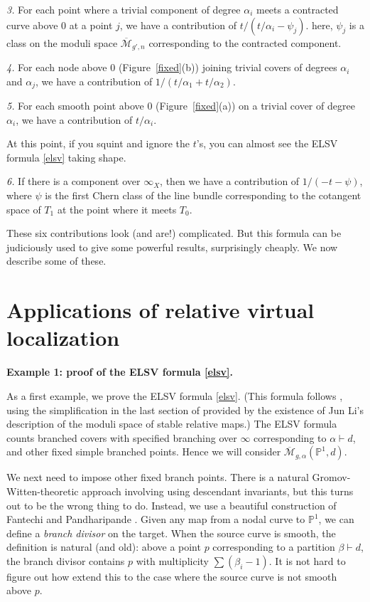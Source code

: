 \documentclass[12pt,letterpaper]{amsart}
\newcommand{\bpoint}[1]{\vspace{3mm}\par \noindent \refstepcounter{subsection}{\bf \thesubsection.} 
  {\bf #1.} }
\newcommand{\proj}{\mathbb P}
\newcommand{\cm}{{\mathcal{M}}}
\newcommand{\cmbar}{\overline{\cm}}
\newcommand{\al}{\alpha}
\newcommand{\be}{\beta}
\newcommand{\lremind}[1]{{\bf[label:  #1]}}
\renewcommand{\lremind}[1]{{}}
\begin{document}
{{\em 3.}  For each point where
 a trivial component of degree $\al_i$
meets  a contracted curve above $0$ at a point $j$,
we have a contribution of $t /  (t/\al_i - \psi_j)$.
here, $\psi_j$ is a class on the moduli space $\cmbar_{g',n}$ corresponding to the
contracted component.

{\em 4.}  For each node above $0$ (Figure~\ref{fixed}(b)) joining
trivial covers of degrees $\al_i$ and $\al_j$, we have a contribution
of $1 / (t/\al_1 + t/ \al_2)$.

{\em 5.}  For each smooth point above $0$ (Figure~\ref{fixed}(a))
on a trivial cover of degree $\al_i$, we have a contribution of
$t/\al_i$.

At this point, if you squint and ignore the $t$'s, 
you can almost see the ELSV
formula \eqref{elsv} taking shape.

{\em 6.}  If there is a component over $\infty_X$, then we have a contribution
of $1/ (-t-\psi)$, where $\psi$ is the first Chern class of the 
line bundle corresponding to the cotangent space of $T_1$ at the point
where it meets $T_0$.

These six contributions look (and are!) complicated.  But this formula
can be judiciously used to give some powerful results, surprisingly
cheaply.  We now describe some of these.

\section{Applications of relative virtual localization}

\bpoint{Example 1:  proof of the ELSV formula \eqref{elsv}}
\label{elsvproof}\lremind{elsvproof}

As a first example, we prove the ELSV formula \eqref{elsv}.  
(This formula follows \cite{hhv}, using the simplification in the 
last section of \cite{hhv} provided by the existence of Jun Li's description
of the moduli space of stable relative maps.)
The ELSV
formula counts branched covers with specified branching over $\infty$
corresponding to $\al \vdash d$, and other fixed simple branched
points.  Hence we will consider $\cmbar_{g,\al}(\proj^1,d)$.

We next need to impose other fixed branch points.  There is a natural
Gromov-Witten-theoretic approach involving using descendant
invariants, but this turns out to be the wrong thing to do.  Instead,
we use a beautiful construction of Fantechi and Pandharipande
\cite{fp}.  Given any map from a nodal curve to $\proj^1$, we can
define a {\em branch divisor} on the target.  When the source
curve is smooth, the definition is natural (and old):
above a point $p$ corresponding to a partition $\be \vdash d$, 
the branch divisor contains $p$ with multiplicity $\sum (\be_i-1)$.
It is not hard to figure out how extend this to the case where
the source curve is not smooth above $p$.

}
\end{document}
